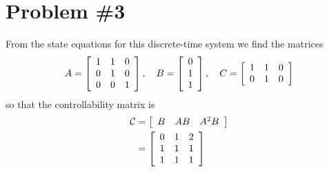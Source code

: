 \documentclass{article}
\begin{document}
\section*{Problem \#3}
From the state equations for this discrete-time system
we find the matrices
$$
A = 
\left[\begin{array}{c c c}
  1 & 1 & 0 \\
  0 & 1 & 0 \\
  0 & 0 & 1
\end{array}\right], \quad
B =
\left[\begin{array}{c}
  0 \\ 1 \\ 1
\end{array}\right], \quad
C =
\left[\begin{array}{c c c}
  1 & 1 & 0 \\
  0 & 1 & 0
\end{array}\right]
$$
so that the controllability matrix is
\begin{align*}
\mathcal{C} &=
\left[\begin{array}{c c c}
  B & A B & A^2 B
\end{array}\right] \\
&=
\left[\begin{array}{c c c}
  0 & 1 & 2 \\
  1 & 1 & 1 \\
  1 & 1 & 1
\end{array}\right]
\end{align*}
\end{document}
